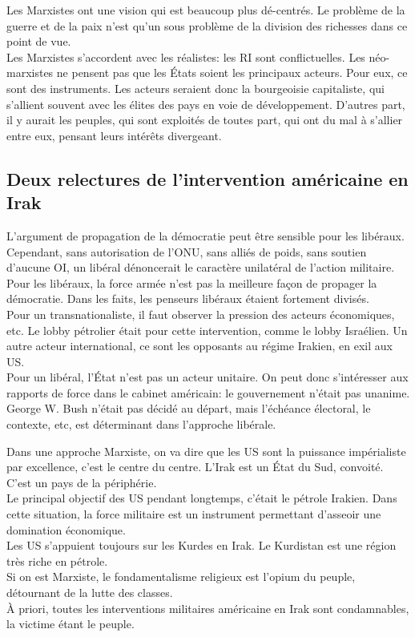 \documentclass[10pt, a4paper, openany]{book}
\begin{document}
Les Marxistes ont une vision qui est beaucoup plus dé-centrés. Le problème de la guerre et de la paix n'est qu'un sous problème de la division des richesses dans ce point de vue. \\
Les Marxistes s'accordent avec les réalistes: les RI sont conflictuelles. Les néo-marxistes ne pensent pas que les États soient les principaux acteurs. Pour eux, ce sont des instruments. Les acteurs seraient donc la bourgeoisie capitaliste, qui s'allient souvent avec les élites des pays en voie de développement. D'autres part, il y aurait les peuples, qui sont exploités de toutes part, qui ont du mal à s'allier entre eux, pensant leurs intérêts divergeant.

\subsection{Deux relectures de l'intervention américaine en Irak}

L'argument de propagation de la démocratie peut être sensible pour les libéraux. Cependant, sans autorisation de l'ONU, sans alliés de poids, sans soutien d'aucune OI, un libéral dénoncerait le caractère unilatéral de l'action militaire. \\
Pour les libéraux, la force armée n'est pas la meilleure façon de propager la démocratie. Dans les faits, les penseurs libéraux étaient fortement divisés. \\
Pour un transnationaliste, il faut observer la pression des acteurs économiques, etc. Le lobby pétrolier était pour cette intervention, comme le lobby Israélien. Un autre acteur international, ce sont les opposants au régime Irakien, en exil aux US. \\
Pour un libéral, l'État n'est pas un acteur unitaire. On peut donc s'intéresser aux rapports de force dans le cabinet américain: le gouvernement n'était pas unanime. George W. Bush n'était pas décidé au départ, mais l'échéance électoral, le contexte, etc, est déterminant dans l'approche libérale. 


Dans une approche Marxiste, on va dire que les US sont la puissance impérialiste par excellence, c'est le centre du centre. L'Irak est un État du Sud, convoité. C'est un pays de la périphérie. \\
Le principal objectif des US pendant longtemps, c'était le pétrole Irakien. Dans cette situation, la force militaire est un instrument permettant d'asseoir une domination économique. \\
Les US s'appuient toujours sur les Kurdes en Irak. Le Kurdistan est une région très riche en pétrole. \\
Si on est Marxiste, le fondamentalisme religieux est l'opium du peuple, détournant de la lutte des classes. \\
À priori, toutes les interventions militaires américaine en Irak sont condamnables, la victime étant le peuple. 
\end{document}
